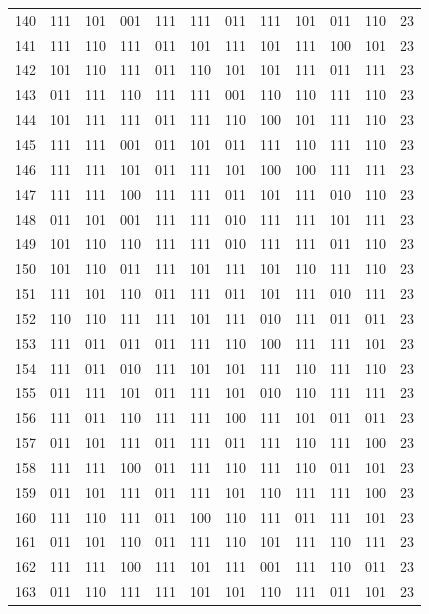 \begin{longtable}{r*{10}{c}r}
140 & 111 & 101 & 001 & 111 & 111 & 011 & 111 & 101 & 011 & 110 & 23\\
141 & 111 & 110 & 111 & 011 & 101 & 111 & 101 & 111 & 100 & 101 & 23\\
142 & 101 & 110 & 111 & 011 & 110 & 101 & 101 & 111 & 011 & 111 & 23\\
143 & 011 & 111 & 110 & 111 & 111 & 001 & 110 & 110 & 111 & 110 & 23\\
144 & 101 & 111 & 111 & 011 & 111 & 110 & 100 & 101 & 111 & 110 & 23\\
145 & 111 & 111 & 001 & 011 & 101 & 011 & 111 & 110 & 111 & 110 & 23\\
146 & 111 & 111 & 101 & 011 & 111 & 101 & 100 & 100 & 111 & 111 & 23\\
147 & 111 & 111 & 100 & 111 & 111 & 011 & 101 & 111 & 010 & 110 & 23\\
148 & 011 & 101 & 001 & 111 & 111 & 010 & 111 & 111 & 101 & 111 & 23\\
149 & 101 & 110 & 110 & 111 & 111 & 010 & 111 & 111 & 011 & 110 & 23\\
150 & 101 & 110 & 011 & 111 & 101 & 111 & 101 & 110 & 111 & 110 & 23\\
151 & 111 & 101 & 110 & 011 & 111 & 011 & 101 & 111 & 010 & 111 & 23\\
152 & 110 & 110 & 111 & 111 & 101 & 111 & 010 & 111 & 011 & 011 & 23\\
153 & 111 & 011 & 011 & 011 & 111 & 110 & 100 & 111 & 111 & 101 & 23\\
154 & 111 & 011 & 010 & 111 & 101 & 101 & 111 & 110 & 111 & 110 & 23\\
155 & 011 & 111 & 101 & 011 & 111 & 101 & 010 & 110 & 111 & 111 & 23\\
156 & 111 & 011 & 110 & 111 & 111 & 100 & 111 & 101 & 011 & 011 & 23\\
157 & 011 & 101 & 111 & 011 & 111 & 011 & 111 & 110 & 111 & 100 & 23\\
158 & 111 & 111 & 100 & 011 & 111 & 110 & 111 & 110 & 011 & 101 & 23\\
159 & 011 & 101 & 111 & 011 & 111 & 101 & 110 & 111 & 111 & 100 & 23\\
160 & 111 & 110 & 111 & 011 & 100 & 110 & 111 & 011 & 111 & 101 & 23\\
161 & 011 & 101 & 110 & 011 & 111 & 110 & 101 & 111 & 110 & 111 & 23\\
162 & 111 & 111 & 100 & 111 & 101 & 111 & 001 & 111 & 110 & 011 & 23\\
163 & 011 & 110 & 111 & 111 & 101 & 101 & 110 & 111 & 011 & 101 & 23\\

\end{longtable}
